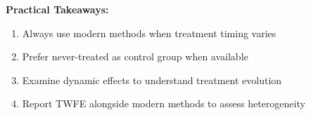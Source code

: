 \textbf{Practical Takeaways:}
\begin{enumerate}
    \item Always use modern methods when treatment timing varies
    \item Prefer never-treated as control group when available
    \item Examine dynamic effects to understand treatment evolution
    \item Report TWFE alongside modern methods to assess heterogeneity
\end{enumerate}

